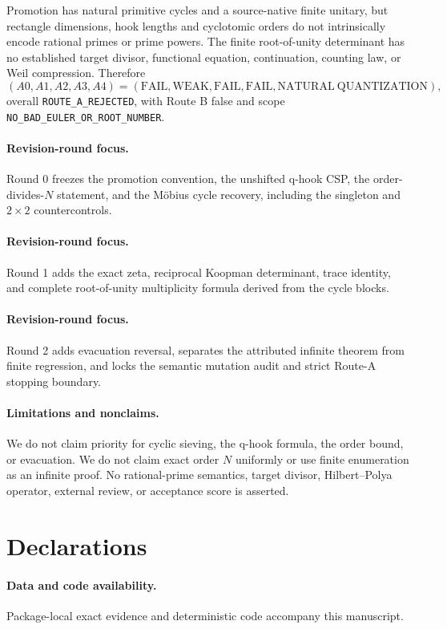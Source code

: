 \documentclass[9pt]{extarticle}
\begin{document}
Promotion has natural primitive cycles and a source-native finite unitary, but
rectangle dimensions, hook lengths and cyclotomic orders do not intrinsically
encode rational primes or prime powers.  The finite root-of-unity determinant
has no established target divisor, functional equation, continuation, counting
law, or Weil compression.  Therefore
\[
 (A0,A1,A2,A3,A4)=(\mathrm{FAIL},\mathrm{WEAK},\mathrm{FAIL},
 \mathrm{FAIL},\mathrm{NATURAL\ QUANTIZATION}),
\]
overall \texttt{ROUTE\_A\_REJECTED}, with Route B false and scope
\texttt{NO\_BAD\_EULER\_OR\_ROOT\_NUMBER}.

\ifcase\CRevisionRound
\paragraph{Revision-round focus.} Round 0 freezes the promotion convention,
the unshifted q-hook CSP, the order-divides-$N$ statement, and the M\"obius
cycle recovery, including the singleton and $2\times2$ countercontrols.
\or
\paragraph{Revision-round focus.} Round 1 adds the exact zeta, reciprocal
Koopman determinant, trace identity, and complete root-of-unity multiplicity
formula derived from the cycle blocks.
\or
\paragraph{Revision-round focus.} Round 2 adds evacuation reversal, separates
the attributed infinite theorem from finite regression, and locks the semantic
mutation audit and strict Route-A stopping boundary.
\fi

\paragraph{Limitations and nonclaims.}
We do not claim priority for cyclic sieving, the q-hook formula, the order
bound, or evacuation.  We do not claim exact order $N$ uniformly or use finite
enumeration as an infinite proof.  No rational-prime semantics, target
divisor, Hilbert--Polya operator, external review, or acceptance score is
asserted.

\section*{Declarations}
\paragraph{Data and code availability.} Package-local exact evidence and
deterministic code accompany this manuscript.
\end{document}
